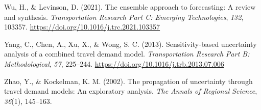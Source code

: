\documentclass[fancy, masters,twoside]{byuthesis}
\newlength{\cslhangindent}
\newlength{\cslentryspacingunit} %
\newenvironment{CSLReferences}[2] %
 {%
  \setlength{\parindent}{0pt}
  \ifodd #1
  \let\oldpar\par
  \def\par{\hangindent=\cslhangindent\oldpar}
  \fi
  \setlength{\parskip}{#2\cslentryspacingunit}
 }%
 {}
\begin{document}
\begin{CSLReferences}{1}{0}
\leavevmode{}%
Wu, H., \& Levinson, D. (2021). The ensemble approach to forecasting: {A} review and synthesis. \emph{Transportation Research Part C: Emerging Technologies}, \emph{132}, 103357. \url{https://doi.org/10.1016/j.trc.2021.103357}

\leavevmode{}%
Yang, C., Chen, A., Xu, X., \& Wong, S. C. (2013). Sensitivity-based uncertainty analysis of a combined travel demand model. \emph{Transportation Research Part B: Methodological}, \emph{57}, 225--244. \url{https://doi.org/10.1016/j.trb.2013.07.006}

\leavevmode{}%
Zhao, Y., \& Kockelman, K. M. (2002). The propagation of uncertainty through travel demand models: {An} exploratory analysis. \emph{The Annals of Regional Science}, \emph{36}(1), 145--163.

\end{CSLReferences}

\cleardoublepage
\pagestyle{byu}

%
\end{document}
